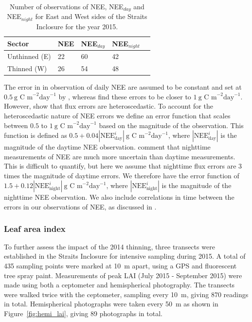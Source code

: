 \documentclass[draft,linenumbers]{agujournal}
\begin{document}
\begin{table}[ht] 
	\caption{Number of observations of NEE, NEE\(_{day}\) and NEE\(_{night}\) for East and West sides of the Straits Inclosure for the year 2015.}
\begin{center}
	\begin{tabular}{| l | l | l | l | l |}
	\hline
	Sector & NEE & NEE\(_{day}\) & NEE\(_{night}\)  \\ \hline
	Unthinned (E) & 22 & 60 & 42 \\ \hline
	Thinned (W) & 26 & 54 & 48 \\ \hline
	\end{tabular}
	\label{table:nee_obs}
\end{center} 
\end{table}

The error in in observation of daily NEE are assumed to be constant and set at $0.5~\text{g C m}^{-2} \text{day}^{-1}$ by \citet{williams2005improved}, whereas \citet{braswell2005estimating} find these errors to be closer to $1~\text{g C m}^{-2} \text{day}^{-1}$. However, \citet{Richardson200838} show that flux errors are heteroscedastic. To account for the heteroscedastic nature of NEE errors we define an error function that scales between $0.5$ to $1~\text{g C m}^{-2} \text{day}^{-1}$ based on the magnitude of the observation. This function is defined as $0.5 + 0.04|\text{NEE}_{\text{day}}^{i}|~\text{g C m}^{-2} \text{day}^{-1}$, where \(|\text{NEE}_{\text{day}}^{i}|\) is the magnitude of the daytime NEE observation. \citet{raupach2005model} comment that nighttime measurements of NEE are much more uncertain than daytime measurements. This is difficult to quantify, but here we assume that nighttime flux errors are 3 times the magnitude of daytime errors. We therefore have the error function of $1.5 + 0.12|\text{NEE}_{\text{night}}^{i}|~\text{g C m}^{-2} \text{day}^{-1}$, where \(|\text{NEE}_{\text{night}}^{i}|\) is the magnitude of the nighttime NEE observation. We also include correlations in time between the errors in our observations of NEE, as discussed in \citet{Pinnington2016299}.

\subsubsection{Leaf area index}

To further assess the impact of the 2014 thinning, three transects were established in the Straits Inclosure for intensive sampling during 2015. A total of 435 sampling points were marked at 10~m apart, using a GPS and fluorescent tree spray paint. Measurements of peak LAI (July 2015 - September 2015) were made using both a ceptometer and hemispherical photography. The transects were walked twice with the ceptometer, sampling every 10~m, giving 870 readings in total. Hemispherical photographs were taken every 50~m as shown in Figure~\ref{fig:hemi_lai}, giving 89 photographs in total. 
\end{document}
